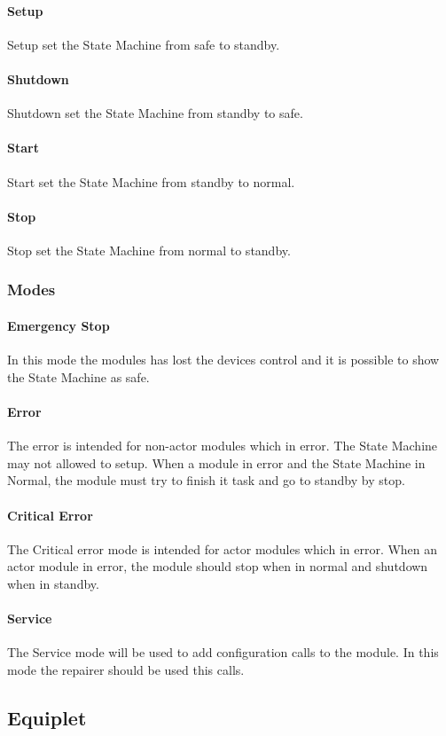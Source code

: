 \documentclass[12pt,a4paper]{report}
\begin{document}
\paragraph{Setup}Setup set the State Machine from safe to standby.
\paragraph{Shutdown}Shutdown set the State Machine from standby to safe.
\paragraph{Start}Start set the State Machine from standby to normal.
\paragraph{Stop}Stop set the State Machine from normal to standby.

\subsubsection{Modes}
\paragraph{Emergency Stop}In this mode the modules has lost the devices control and it is possible to show the State Machine as safe.
\paragraph{Error}The error is intended for non-actor modules which in error. The State Machine may not allowed to setup. When a module in error and the State Machine in Normal, the module must try to finish it task and go to standby by stop.
\paragraph{Critical Error}The Critical error mode is intended for actor modules which in error. When an actor module in error, the module should stop when in normal and shutdown when in standby.
\paragraph{Service}The Service mode will be used to add configuration calls to the module. In this mode the repairer should be used this calls.

\subsection{Equiplet}
\end{document}
